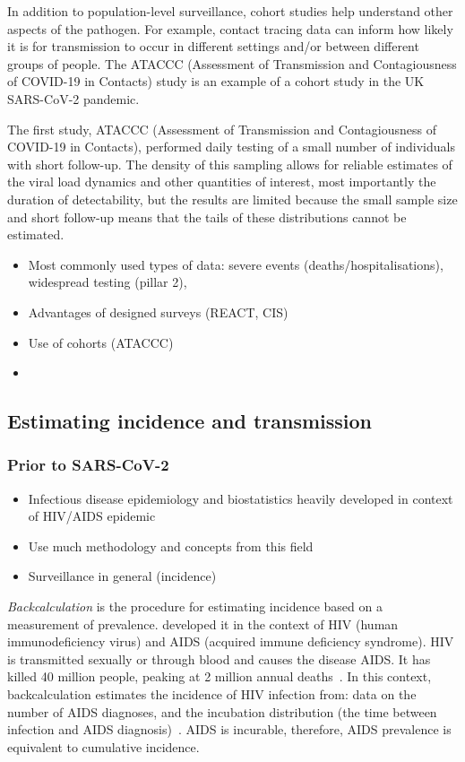 \documentclass[thesis.tex]{subfiles}
\begin{document}
In addition to population-level surveillance, cohort studies help understand other aspects of the pathogen.
For example, contact tracing data can inform how likely it is for transmission to occur in different settings and/or between different groups of people.
The ATACCC (Assessment of Transmission and Contagiousness of COVID-19 in Contacts) study is an example of a cohort study in the UK SARS-CoV-2 pandemic.

The first study, ATACCC (Assessment of Transmission and Contagiousness of COVID-19 in Contacts), performed daily testing of a small number of individuals with short follow-up.
The density of this sampling allows for reliable estimates of the viral load dynamics and other quantities of interest, most importantly the duration of detectability, but the results are limited because the small sample size and short follow-up means that the tails of these distributions cannot be estimated.

\begin{itemize}
    \item Most commonly used types of data: severe events (deaths/hospitalisations), widespread testing (pillar 2), 
    \item Advantages of designed surveys (REACT, CIS)
    \item Use of cohorts (ATACCC)
    \item 
\end{itemize}

\subsection{Estimating incidence and transmission}

\subsubsection{Prior to SARS-CoV-2}

\begin{itemize}
    \item Infectious disease epidemiology and biostatistics heavily developed in context of HIV/AIDS epidemic
    \item Use much methodology and concepts from this field
    \item Surveillance in general (incidence)
\end{itemize}


\emph{Backcalculation} is the procedure for estimating incidence based on a measurement of prevalence.
\Textcite{brookmeyerMethod} developed it in the context of HIV (human immunodeficiency virus) and AIDS (acquired immune deficiency syndrome).
HIV is transmitted sexually or through blood and causes the disease AIDS.
It has killed 40 million people, peaking at 2 million annual deaths~\autocite{unaids2023}.
In this context, backcalculation estimates the incidence of HIV infection from: data on the number of AIDS diagnoses, and the incubation distribution (the time between infection and AIDS diagnosis)~\autocite{brookmeyerBackcalculation,brookmeyerMeasuring}.
AIDS is incurable, therefore, AIDS prevalence is equivalent to cumulative incidence.
\end{document}
